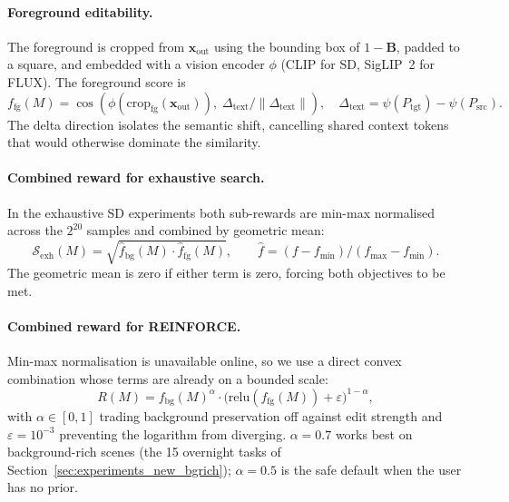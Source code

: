 \paragraph{Foreground editability.}
The foreground is cropped from $\mathbf{x}_{\text{out}}$ using the bounding box of $1-\mathbf{B}$, padded to a square, and embedded with a vision encoder $\phi$ (CLIP for SD, SigLIP~2 for FLUX). The foreground score is
\begin{equation}
f_{\text{fg}}(M) = \cos\!\left(\phi(\text{crop}_{\text{fg}}(\mathbf{x}_{\text{out}})),\; \Delta_{\text{text}} / \|\Delta_{\text{text}}\|\right), \quad \Delta_{\text{text}} = \psi(P_{\text{tgt}}) - \psi(P_{\text{src}}).
\end{equation}
The delta direction isolates the semantic shift, cancelling shared context tokens that would otherwise dominate the similarity.

\paragraph{Combined reward for exhaustive search.}
In the exhaustive SD experiments both sub-rewards are min-max normalised across the $2^{20}$ samples and combined by geometric mean:
\begin{equation}
    \mathcal{S}_{\text{exh}}(M) = \sqrt{\hat{f}_{\text{bg}}(M) \cdot \hat{f}_{\text{fg}}(M)}, \qquad \hat{f}=(f - f_{\min})/(f_{\max}-f_{\min}).
    \label{eq::objective_exh}
\end{equation}
The geometric mean is zero if either term is zero, forcing both objectives to be met.

\paragraph{Combined reward for REINFORCE.}
Min-max normalisation is unavailable online, so we use a direct convex combination whose terms are already on a bounded scale:
\begin{equation}
    R(M) = f_{\text{bg}}(M)^{\alpha} \cdot \bigl(\text{relu}(f_{\text{fg}}(M)) + \varepsilon\bigr)^{1-\alpha},
    \label{eq::reward_reinforce}
\end{equation}
with $\alpha \in [0,1]$ trading background preservation off against edit strength and $\varepsilon=10^{-3}$ preventing the logarithm from diverging. $\alpha=0.7$ works best on background-rich scenes (the 15 overnight tasks of Section~\ref{sec:experiments_new_bgrich}); $\alpha=0.5$ is the safe default when the user has no prior.


